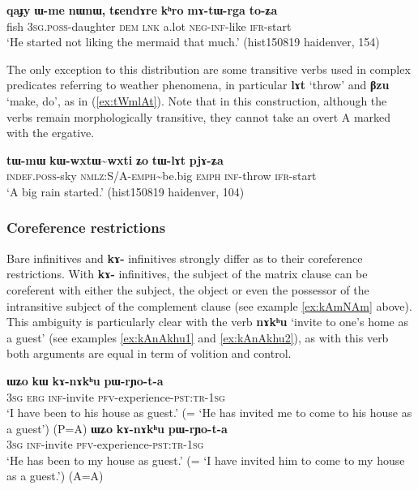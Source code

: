 \documentclass[oneside,a4paper,11pt]{article}
\newcommand{\ipa}[1]{\textbf{\phon#1}} %
\newcommand{\tld}{\textasciitilde{}}
\begin{document}
\begin{exe}
\ex  \label{ex:mAtWrga}
\gll \ipa{qaɟy} 	\ipa{ɯ-me} 	\ipa{nɯnɯ,} 	\ipa{tɕendɤre} 	\ipa{kʰro} 	\ipa{mɤ-tɯ-rga} 	\ipa{to-ʑa} \\
fish \textsc{3sg.poss}-daughter \textsc{dem} \textsc{lnk} a.lot \textsc{neg-inf}-like \textsc{ifr}-start \\
\glt `He started not liking the mermaid that much.' (hist150819 haidenver, 154)
\end{exe}
 
The only exception to this distribution are some transitive verbs used in complex predicates referring to weather phenomena, in particular \ipa{lɤt} `throw' and \ipa{βzu} `make, do', as in (\ref{ex:tWmlAt}). Note that in this construction, although the verbs remain morphologically transitive, they cannot take an overt A marked with the ergative.
 
\begin{exe}
\ex  \label{ex:tWmlAt}
\gll
\ipa{tɯ-mɯ} 	\ipa{kɯ-wxtɯ\tld{}wxti} 	\ipa{ʑo} 	\ipa{tɯ-lɤt} 	\ipa{pjɤ-ʑa} \\
\textsc{indef.poss}-sky \textsc{nmlz:S/A-emph}\tld{}be.big \textsc{emph} \textsc{inf}-throw \textsc{ifr}-start \\
\glt `A big rain started.' (hist150819 haidenver, 104)
\end{exe}



\subsubsection{Coreference restrictions}
Bare infinitives and \ipa{kɤ-} infinitives strongly differ as to their coreference restrictions. With \ipa{kɤ-} infinitives, the subject of the matrix clause can be coreferent with either the subject, the object or even the possessor of the intransitive subject of the complement clause (see example \ref{ex:kAmNAm} above). This ambiguity is particularly clear with the verb \ipa{nɤkʰu} `invite to one's home as a guest' (see examples \ref{ex:kAnAkhu1} and \ref{ex:kAnAkhu2}), as with this verb both arguments are equal in term of volition and control.

\begin{exe}
\ex  \label{ex:kAnAkhu1}
\gll
\ipa{ɯʑo} 	\ipa{kɯ} 	\ipa{kɤ-nɤkʰu} 	\ipa{pɯ-rɲo-t-a} \\
\textsc{3sg} \textsc{erg} \textsc{inf}-invite \textsc{pfv}-experience-\textsc{pst:tr-1sg} \\
\glt `I have been to his house as guest.'  (= `He has invited me to come to his house as a guest') (P=A)
\ex  \label{ex:kAnAkhu2}
\gll
\ipa{ɯʑo} 	\ipa{kɤ-nɤkʰu} 	\ipa{pɯ-rɲo-t-a} \\
\textsc{3sg}  \textsc{inf}-invite \textsc{pfv}-experience-\textsc{pst:tr-1sg} \\
\glt `He has been to my house as guest.' (= `I have invited him to come to my house as a guest.') (A=A)
\end{exe}
\end{document}

